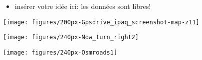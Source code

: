 {\begin{minipage}{0.8\textwidth}
\begin{itemize}
  \item insérer votre idée ici: les données sont libres!
  \end{itemize}
  \end{minipage} %
  \begin{minipage}{0.19\textwidth}
    \texttt{[image: figures/200px-Gpsdrive\_ipaq\_screenshot-map-z11]}
    \vskip 1cm

    \texttt{[image: figures/240px-Now\_turn\_right2]}
    \vskip 1cm
    
    \texttt{[image: figures/240px-Osmroads1]}
    \vskip 1cm
  \end{minipage}
}







